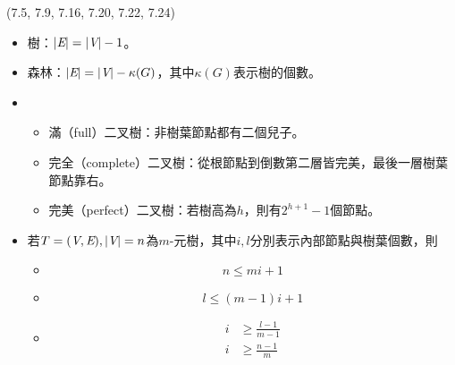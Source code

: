 \item \begin{theorem}{(7.5, 7.9, 7.16, 7.20, 7.22, 7.24)} \quad\quad
    \begin{itemize}
        \item 樹：$|\textit{E}| = |\textit{V}| - 1$。
        \item 森林：$|\textit{E}| = |\textit{V}| - \kappa(G)$，其中$\kappa(G)$表示樹的個數。
        \item \begin{itemize}
            \item 滿（full）二叉樹：非樹葉節點都有二個兒子。
            \item 完全（complete）二叉樹：從根節點到倒數第二層皆完美，最後一層樹葉節點靠右。
            \item 完美（perfect）二叉樹：若樹高為$h$，則有$2^{h + 1} - 1$個節點。
        \end{itemize}
        \item 若$T = (\textit{V}, \textit{E}), |\textit{V}| = n$為$m$-元樹，其中$i, l$分別表示內部節點與樹葉個數，則\begin{itemize}
            \item \begin{equation}
                n \le mi + 1
            \end{equation}
            \item \begin{equation}
                l \le (m - 1)i + 1
            \end{equation}
            \item \begin{equation}
                \begin{aligned}
                    i & \ge \frac{l - 1}{m - 1} \\
                    i & \ge \frac{n - 1}{m}
                \end{aligned}
            \end{equation}


\end{itemize}
\end{itemize}
\end{theorem}

